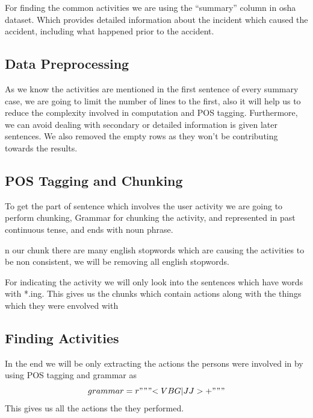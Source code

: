 \documentclass[DIV=calc, paper=a4, fontsize=11pt, twocolumn]{scrartcl}	 %
\begin{document}
For finding the common activities we are using the “summary” column in
osha dataset. Which provides detailed information about the incident
which caused the accident, including what happened prior to the
accident.


\subsection{Data Preprocessing}

As we know the activities are mentioned in the first sentence of every summary case, we are going to limit the number of lines to the first, also it will help us to reduce the complexity involved in computation and POS tagging. Furthermore, we can avoid dealing with secondary or detailed information is given later sentences.
We also removed the empty rows as they won’t be contributing towards
the results.




\subsection{POS Tagging and Chunking}

To get the part of sentence which involves the user activity we are
going to perform chunking, Grammar for chunking the activity, and
represented in past continuous tense, and ends with noun phrase.

n our chunk there are many english stopwords which are causing the activities to be non consistent, we will be removing all english stopwords.


For indicating the activity we will only look into the sentences which have words with *.ing. This
gives us the chunks which contain actions along with the things which they were envolved with

\subsection{Finding Activities}
In the end we will be only extracting the actions the persons were involved in by using
POS tagging and grammar as
$$grammar = r"""{<VBG|JJ>+}"""$$
This gives us all the actions the they performed.
\end{document}
